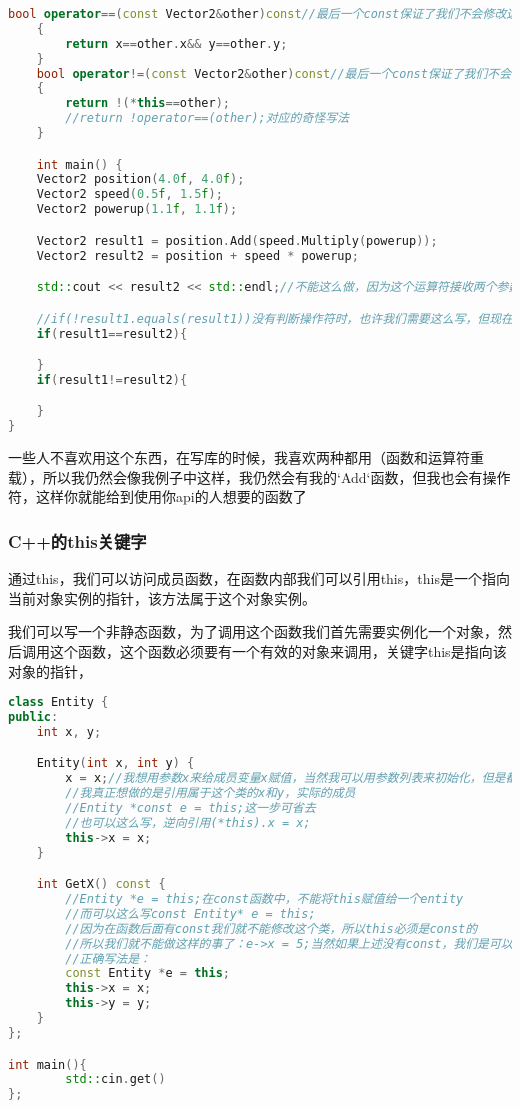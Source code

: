 \begin{lstlisting}[language=c++]
    bool operator==(const Vector2&other)const//最后一个const保证了我们不会修改这个类
    {
        return x==other.x&& y==other.y;
    }
    bool operator!=(const Vector2&other)const//最后一个const保证了我们不会修改这个类
    {
        return !(*this==other);
        //return !operator==(other);对应的奇怪写法
    }

    int main() {
    Vector2 position(4.0f, 4.0f);
    Vector2 speed(0.5f, 1.5f);
    Vector2 powerup(1.1f, 1.1f);

    Vector2 result1 = position.Add(speed.Multiply(powerup));
    Vector2 result2 = position + speed * powerup;

    std::cout << result2 << std::endl;//不能这么做，因为这个运算符接收两个参数，一个是输出流output stream，也就是cout，另一个就是vector2了

    //if(!result1.equals(result1))没有判断操作符时，也许我们需要这么写，但现在重载了操作符，我们这样写：
    if(result1==result2){

    }
    if(result1!=result2){

    }
}
\end{lstlisting}

一些人不喜欢用这个东西，在写库的时候，我喜欢两种都用（函数和运算符重载），所以我仍然会像我例子中这样，我仍然会有我的`Add`函数，但我也会有操作符，这样你就能给到使用你api的人想要的函数了


\subsubsection{C++的this关键字}

通过{\ncodestyle this}，我们可以访问成员函数，在函数内部我们可以引用{\ncodestyle this}，{\ncodestyle this}是一个指向当前对象实例的指针，该方法属于这个对象实例。


我们可以写一个非静态函数，为了调用这个函数我们首先需要实例化一个对象，然后调用这个函数，这个函数必须要有一个有效的对象来调用，关键字{\ncodestyle this}是指向该对象的指针，

\begin{lstlisting}[language=c++]
class Entity {
public:
    int x, y;

    Entity(int x, int y) {
        x = x;//我想用参数x来给成员变量x赋值，当然我可以用参数列表来初始化，但是都是x，我不想这么做，我想在函数内部写，这么做实际上是将x赋值给了自己，也就是什么都没做
        //我真正想做的是引用属于这个类的x和y，实际的成员
        //Entity *const e = this;这一步可省去
        //也可以这么写，逆向引用(*this).x = x;
        this->x = x;
    }

    int GetX() const {
        //Entity *e = this;在const函数中，不能将this赋值给一个entity
        //而可以这么写const Entity* e = this;
        //因为在函数后面有const我们就不能修改这个类，所以this必须是const的
        //所以我们就不能做这样的事了：e->x = 5;当然如果上述没有const，我们是可以的
        //正确写法是：
        const Entity *e = this;
        this->x = x;
        this->y = y;
    }
};

int main(){
        std::cin.get()
};
\end{lstlisting}

